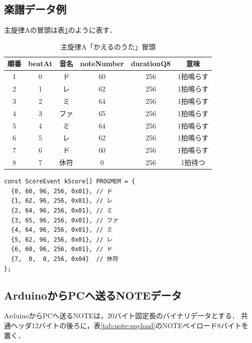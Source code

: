 \documentclass[uplatex,dvipdfmx]{jlreq}
\begin{document}
\subsection{楽譜データ例}

主旋律Aの冒頭は表\ref{tab:melody}のように表す．

\begin{table}[H]
\centering
\caption{主旋律A「かえるのうた」冒頭}
\label{tab:melody}
\begin{tabular}{cccccc}
\toprule
\textbf{順番} & \textbf{beatAt} & \textbf{音名} & \textbf{noteNumber} & \textbf{durationQ8} & \textbf{意味} \\
\midrule
1 & 0 & ド & 60 & 256 & 1拍鳴らす \\
2 & 1 & レ & 62 & 256 & 1拍鳴らす \\
3 & 2 & ミ & 64 & 256 & 1拍鳴らす \\
4 & 3 & ファ & 65 & 256 & 1拍鳴らす \\
5 & 4 & ミ & 64 & 256 & 1拍鳴らす \\
6 & 5 & レ & 62 & 256 & 1拍鳴らす \\
7 & 6 & ド & 60 & 256 & 1拍鳴らす \\
8 & 7 & 休符 & 0 & 256 & 1拍待つ \\
\bottomrule
\end{tabular}
\end{table}

\begin{verbatim}
const ScoreEvent kScore[] PROGMEM = {
  {0, 60, 96, 256, 0x01}, // ド
  {1, 62, 96, 256, 0x01}, // レ
  {2, 64, 96, 256, 0x01}, // ミ
  {3, 65, 96, 256, 0x01}, // ファ
  {4, 64, 96, 256, 0x01}, // ミ
  {5, 62, 96, 256, 0x01}, // レ
  {6, 60, 96, 256, 0x01}, // ド
  {7,  0,  0, 256, 0x04}  // 休符
};
\end{verbatim}

\subsection{ArduinoからPCへ送るNOTEデータ}

ArduinoからPCへ送るNOTEは，20バイト固定長のバイナリデータとする．
共通ヘッダ12バイトの後ろに，表\ref{tab:note-payload}のNOTEペイロード8バイトを置く．
\end{document}
